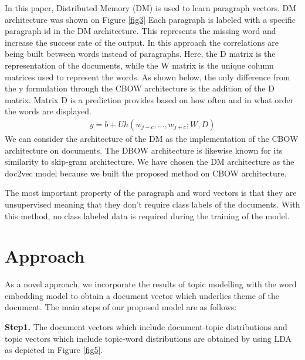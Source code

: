 \documentclass[a4paper,fleqn]{cas-dc}
\begin{document}
\phantom{In this paper, Distributed Memory (DM) is used to learn paragraph vectors. DM architecture was shown on Figure 3. Each paragraph is labeled with a specific paragraph id in th}
\phantom{In this paper, Distributed Memory (DM) is used to learn paragraph vectors. DM architecture was shown on Figure 3. Each paragraph is labeled with a specific paragraph id in th}
In this paper, Distributed Memory (DM) is used to learn paragraph vectors. DM architecture was shown on Figure \ref{fig3} Each paragraph is labeled with a specific paragraph id in the DM architecture. This represents the missing word and increase the success rate of the output. In this approach the correlations are being built between words instead of paragraphs. Here, the D matrix is the representation of the documents, while the W matrix is the unique column matrices used to represent the words.  
As shown below, the only difference from the y formulation through the CBOW architecture is the addition of the D matrix. Matrix D is a prediction provides based on how often and in what order the words are displayed.
\begin{equation}
\begin{split}
\label{eq6}
y = b+Uh(w_{j-c},...,w_{j+c};W,D)   
\end{split}      
\end{equation}
We can consider the architecture of the DM as the implementation of the CBOW architecture on documents. The DBOW architecture is likewise known for its similarity to skip-gram architecture. We have chosen the DM architecture as the doc2vec model because we built the proposed method on CBOW architecture.

The most important property of the paragraph and word vectors is that they are unsupervised meaning that they don't require class labels of the documents. With this method, no class labeled data is required during the training of the model.  

\section{Approach}


As a novel approach, we incorporate the results of topic modelling with the word embedding model to obtain a document vector which underlies theme of the document.  
The main steps of our proposed model are as follows:

\textbf{Step1.} The document vectors which include document-topic distributions and topic vectors which include topic-word distributions are obtained by using LDA as depicted in Figure \ref{fig5}.
\end{document}
